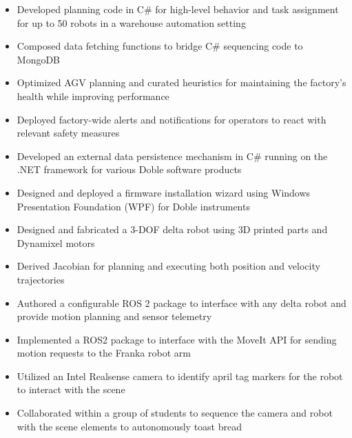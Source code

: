 \documentclass[10pt,a4paper,ragged2e,withhyper]{altacv}
\begin{document}
    \begin{itemize}
        \item Developed planning code in C\# for high-level behavior and task assignment for up to 50 robots in a warehouse automation setting
        \item Composed data fetching functions to bridge C\# sequencing code to MongoDB
        \item Optimized AGV planning and curated heuristics for maintaining the factory's health while improving performance
        \item Deployed factory-wide alerts and notifications for operators to react with relevant safety measures
    \end{itemize}
    \begin{itemize}
        \item Developed an external data persistence mechanism in C\# running on the .NET framework for various Doble software products
        \item Designed and deployed a firmware installation wizard using Windows Presentation Foundation (WPF) for Doble instruments
    \end{itemize}
    \vspace{-1.5em}
    \begin{itemize}
        \item Designed and fabricated a 3-DOF delta robot using 3D printed parts and Dynamixel motors
        \item Derived Jacobian for planning and executing both position and velocity trajectories
        \item Authored a configurable ROS 2 package to interface with any delta robot and provide motion planning and sensor telemetry
    \end{itemize}
    \begin{itemize}
        \item Implemented a ROS2 package to interface with the MoveIt API for sending motion requests to the Franka robot arm
        \item Utilized an Intel Realsense camera to identify april tag markers for the robot to interact with the scene
        \item Collaborated within a group of students to sequence the camera and robot with the scene elements to autonomously toast bread
    \end{itemize}
\end{document}
